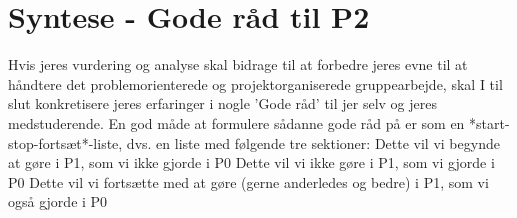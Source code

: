 \documentclass[a4paper,12pt,twoside,openright]{memoir}
\begin{document}
    \section{Syntese - Gode råd til P2}
    Hvis jeres vurdering og analyse skal bidrage til at forbedre jeres evne til at håndtere det 
    problemorienterede og projektorganiserede gruppearbejde, skal I til slut konkretisere jeres 
    erfaringer i nogle ’Gode råd’ til jer selv og jeres medstuderende. En god måde at formulere sådanne 
    gode råd på er som en *start-stop-fortsæt*-liste, dvs. en liste med følgende tre sektioner: 
    Dette vil vi begynde at gøre i P1, som vi ikke gjorde i P0 
    Dette vil vi ikke gøre i P1, som vi gjorde i P0 
    Dette vil vi fortsætte med at gøre (gerne anderledes og bedre) i P1, som vi også gjorde i P0 
\end{document}

